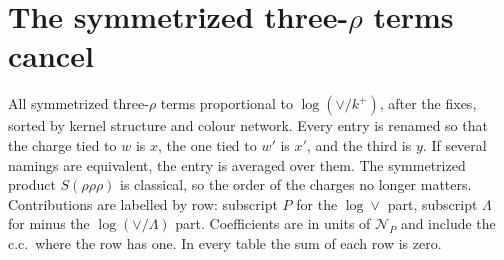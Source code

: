 \documentclass[10pt]{article}
\numberwithin{equation}{section}
\newcommand{\NP}{\mathcal N_{P}}
\begin{document}
\section{The symmetrized three-\texorpdfstring{$\rho$}{rho} terms cancel}\label{sec:three}
All symmetrized three-$\rho$ terms proportional to $\log(\vee/k^+)$, after the fixes, sorted by kernel structure and colour network. Every entry is renamed so that the charge tied to $w$ is $x$, the one tied to $w'$ is $x'$, and the third is $y$. If several namings are equivalent, the entry is averaged over them. The symmetrized product $S(\rho\rho\rho)$ is classical, so the order of the charges no longer matters. Contributions are labelled by row: subscript $P$ for the $\log\vee$ part, subscript $\Lambda$ for minus the $\log(\vee/\Lambda)$ part. Coefficients are in units of $\NP$ and include the c.c.\ where the row has one. In every table the sum of each row is zero.
\end{document}
